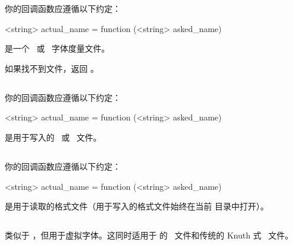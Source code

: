 
你的回调函数应遵循以下约定：

\begin{typing}
<string> actual_name =
    function (<string> asked_name)
\end{typing}

 是一个 \OTF\ 或 \TFM\ 字体度量文件。

如果找不到文件，返回 。

\subsection{}


你的回调函数应遵循以下约定：

\begin{typing}
<string> actual_name =
    function (<string> asked_name)
\end{typing}

 是用于写入的 \PDF\ 或 \DVI\ 文件。

\subsection{}


你的回调函数应遵循以下约定：

\begin{typing}
<string> actual_name =
    function (<string> asked_name)
\end{typing}

 是用于读取的格式文件（用于写入的格式文件始终在当前
目录中打开）。

\subsection{}


类似于 ，但用于虚拟字体。这同时适用于 \ALEPH 的
\OVF\ 文件和传统的 Knuth 式 \VF\ 文件。

\subsection{}

